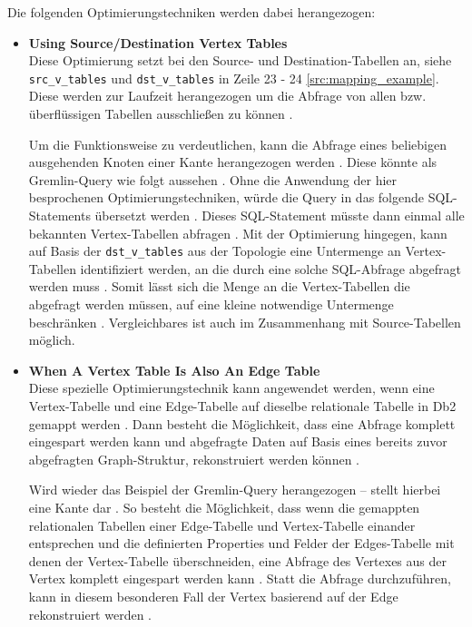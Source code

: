 Die folgenden Optimierungstechniken werden dabei herangezogen:
\begin{itemize}
    \item \textbf{Using Source/Destination Vertex Tables}\\
    Diese Optimierung setzt bei den Source- und Destination-Tabellen an, siehe \texttt{src\_v\_tables} und \texttt{dst\_v\_tables} in Zeile 23 - 24 \autoref{src:mapping_example}. Diese werden zur Laufzeit herangezogen um die Abfrage von allen bzw. überflüssigen Tabellen ausschließen zu können \cite{sigmod_tian}.

    Um die Funktionsweise zu verdeutlichen, kann die Abfrage eines beliebigen ausgehenden Knoten einer Kante herangezogen werden \cite{sigmod_tian}. Diese könnte als Gremlin-Query wie folgt aussehen  \cite{sigmod_tian}. Ohne die Anwendung der hier besprochenen Optimierungstechniken, würde die Query in das folgende SQL-Statements übersetzt werden  \cite{sigmod_tian}. Dieses SQL-Statement müsste dann einmal alle bekannten Vertex-Tabellen abfragen \cite{sigmod_tian}. Mit der Optimierung hingegen, kann auf Basis der \texttt{dst\_v\_tables} aus der Topologie eine Untermenge an Vertex-Tabellen identifiziert werden, an die durch eine solche SQL-Abfrage abgefragt werden muss \cite{sigmod_tian}. Somit lässt sich die Menge an die Vertex-Tabellen die abgefragt werden müssen, auf eine kleine notwendige Untermenge beschränken \cite{sigmod_tian}. Vergleichbares ist auch im Zusammenhang mit Source-Tabellen möglich.

    \item \textbf{When A Vertex Table Is Also An Edge Table}\\
    Diese spezielle Optimierungstechnik kann angewendet werden, wenn eine Vertex-Tabelle und eine Edge-Tabelle auf dieselbe relationale Tabelle in Db2 gemappt werden \cite{sigmod_tian}. Dann besteht die Möglichkeit, dass eine Abfrage komplett eingespart werden kann und abgefragte Daten auf Basis eines  bereits zuvor abgefragten Graph-Struktur, rekonstruiert werden können \cite{sigmod_tian}. 

    Wird wieder das Beispiel der Gremlin-Query  herangezogen --  stellt hierbei eine Kante dar \cite{sigmod_tian}. So besteht die Möglichkeit, dass wenn die gemappten relationalen Tabellen einer Edge-Tabelle und Vertex-Tabelle einander entsprechen und die definierten Properties und Felder der Edges-Tabelle mit denen der Vertex-Tabelle überschneiden, eine Abfrage des Vertexes aus der Vertex komplett eingespart werden kann \cite{sigmod_tian}. Statt die Abfrage durchzuführen, kann in diesem besonderen Fall der Vertex basierend auf der Edge  rekonstruiert werden \cite{sigmod_tian}.


\end{itemize}
